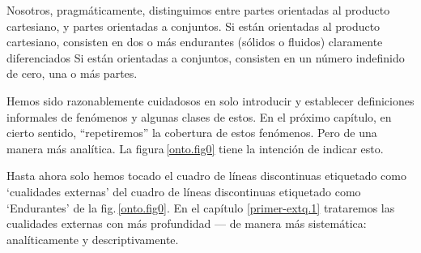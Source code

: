 
  
\begynd
\pind Nosotros, pragmáticamente, distinguimos entre
\begynd
\pind partes orientadas al producto cartesiano, y 
\pind partes orientadas a conjuntos.
\afslut
\pind Si están orientadas al producto cartesiano, consisten en dos o más
      endurantes (sólidos o fluidos) claramente diferenciados 
\pind Si están orientadas a conjuntos, consisten en un número indefinido de \nyl cero,
      una o más partes.
\afslut



\label{An Upper Ontology}

\begynd
\pind Hemos sido razonablemente cuidadosos
\begynd  
\pind en solo introducir y establecer
      definiciones informales 
\pind de fenómenos y algunas clases de estos.
\afslut
\pind En el próximo capítulo, en cierto sentido, ``repetiremos'' la cobertura de
      estos fenómenos.
\begynd
\pind Pero  de una manera más analítica.
\pind La figura\,\vref{onto.fig0} tiene la intención de indicar esto.
\afslut
\afslut

\mnewfoil

\noindent
{}

\mnewfoil

\noindent
\begynd
\pind Hasta ahora solo hemos tocado 
\begynd
\pind el cuadro de líneas discontinuas etiquetado como `cualidades externas' 
\pind del cuadro de líneas discontinuas etiquetado como `Endurantes' de la fig.\,\ref{onto.fig0}.
\afslut
\pind En el capítulo \ref{primer-extq.1} trataremos las cualidades externas
      con más profundidad ---
\begynd
\pind de manera más sistemática: analíticamente y descriptivamente.
\afslut
\afslut


